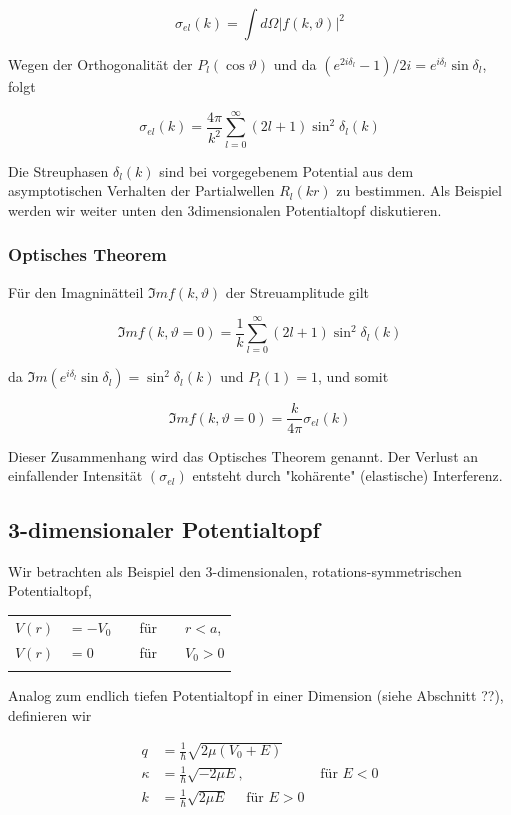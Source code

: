 \documentclass[10pt, letterpaper]{article}
\begin{document}
$$
\sigma_{e l}(k)=\int d \Omega|f(k, \vartheta)|^{2}
$$

Wegen der Orthogonalität der $P_{l}(\cos \vartheta)$ und da $\left(e^{2 i \delta_{l}}-1\right) / 2 i=e^{i \delta_{l}} \sin \delta_{l}$, folgt

$$
\sigma_{e l}(k)=\frac{4 \pi}{k^{2}} \sum_{l=0}^{\infty}(2 l+1) \sin ^{2} \delta_{l}(k)
$$

Die Streuphasen $\delta_{l}(k)$ sind bei vorgegebenem Potential aus dem asymptotischen Verhalten der Partialwellen $R_{l}(k r)$ zu bestimmen. Als Beispiel werden wir weiter unten den 3dimensionalen Potentialtopf diskutieren.

\subsubsection*{Optisches Theorem}
Für den Imagninätteil $\Im m f(k, \vartheta)$ der Streuamplitude gilt

$$
\Im m f(k, \vartheta=0)=\frac{1}{k} \sum_{l=0}^{\infty}(2 l+1) \sin ^{2} \delta_{l}(k)
$$

da $\Im m\left(e^{i \delta_{l}} \sin \delta_{l}\right)=\sin ^{2} \delta_{l}(k)$ und $P_{l}(1)=1$, und somit

$$
\Im m f(k, \vartheta=0)=\frac{k}{4 \pi} \sigma_{e l}(k)
$$

Dieser Zusammenhang wird das Optisches Theorem genannt. Der Verlust an einfallender Intensität $\left(\sigma_{e l}\right)$ entsteht durch "kohärente" (elastische) Interferenz.

\subsection*{3-dimensionaler Potentialtopf}
Wir betrachten als Beispiel den 3-dimensionalen, rotations-symmetrischen Potentialtopf,

\begin{center}
\begin{tabular}{rlrlrl}
$V(r)$ & $=-V_{0}$ &  & für &  & $r<a$, \\
$V(r)$ & $=0$ &  & für &  & $V_{0}>0$ \\
 &  &  &  &  &  \\
\hline
\end{tabular}
\end{center}

Analog zum endlich tiefen Potentialtopf in einer Dimension (siehe Abschnitt ??), definieren wir

$$
\begin{array}{rlr}
q & =\frac{1}{\hbar} \sqrt{2 \mu\left(V_{0}+E\right)} & \\
\kappa & =\frac{1}{\hbar} \sqrt{-2 \mu E}, & \text { für } E<0 \\
k & =\frac{1}{\hbar} \sqrt{2 \mu E} \quad \text { für } E>0
\end{array}
$$
\end{document}
